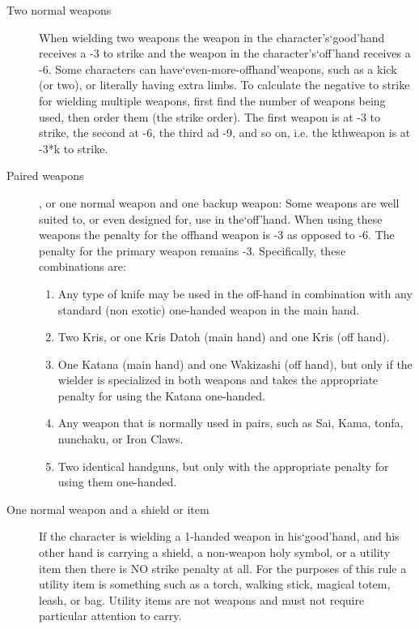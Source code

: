 \documentclass[twoside]{book}
\begin{document}
\begin{description}
    
  \item[Two normal weapons] 
    {  
    When wielding two weapons the weapon in the character's`good'hand receives a -3 to strike and the weapon in the character's`off'hand receives a -6. Some characters can have`even-more-offhand'weapons, such as a kick (or two), or literally having extra limbs. To calculate the negative to strike for wielding multiple weapons, first find the number of weapons being used, then order them (the strike order). The first weapon is at -3 to strike, the second at -6, the third ad -9, and so on, i.e. the kthweapon is at -3*k to strike.
    }
  
  \item[Paired weapons] 
    {  
    , or one normal weapon and one backup weapon: Some weapons are well suited to, or even designed for, use in the`off'hand. When using these weapons the penalty for the offhand weapon is -3 as opposed to -6. The penalty for the primary weapon remains -3. Specifically, these combinations are:
\begin{enumerate}
      
  \item 
    {  
    Any type of knife may be used in the off-hand in combination with any standard (non exotic) one-handed weapon in the main hand.
    }
  
  \item 
    {  
    Two Kris, or one Kris Datoh (main hand) and one Kris (off hand).
    }
  
  \item 
    {  
    One Katana (main hand) and one Wakizashi (off hand), but only if the wielder is specialized in both weapons and takes the appropriate penalty for using the Katana one-handed.
    }
  
  \item 
    {  
    Any weapon that is normally used in pairs, such as Sai, Kama, tonfa, nunchaku, or Iron Claws.
    }
  
  \item 
    {  
    Two identical handguns, but only with the appropriate penalty for using them one-handed.
    }
  
\end{enumerate}
  
    }
  
  \item[One normal weapon and a shield or item] 
    {  
    If the character is wielding a 1-handed weapon in his`good'hand, and his other hand is carrying a shield, a non-weapon holy symbol, or a utility item then there is NO strike penalty at all. For the purposes of this rule a utility item is something such as a torch, walking stick, magical totem, leash, or bag. Utility items are not weapons and must not require particular attention to carry.
    }
  
\end{description}
  
\end{document}
